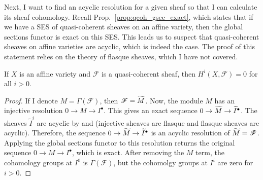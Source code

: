 Next, I want to find an acyclic resolution for a given sheaf so that I can
calculate its sheaf cohomology. Recall Prop.~\ref{prop:qcoh_gsec_exact},
which states that if we have a SES of quasi-coherent sheaves on an affine
variety, then the global sections functor is exact on this SES.
This leads us to suspect that quasi-coherent sheaves on affine varieties
are acyclic, which is indeed the case. The proof of this statement relies
on the theory of flasque sheaves, which I have not covered.
\begin{lemm}%
  \label{lemm:affine_cohom_vanishes}
  If $X$ is an affine variety and $\mathscr{F}$ is a quasi-coherent
  sheaf, then $H^{i}(X, \mathscr{F})=0$ for all $i>0$.
\end{lemm}
\begin{proof}
  If I denote $M=\Gamma(\mathscr{F})$, then $\mathscr{F}=\widetilde{M}$. Now, the
  module $M$ has an injective resolution $0\to M\to I^{\bullet}$.
  This gives an exact sequence $0\to \widetilde{M}\to\widetilde{I}^{\bullet}$.
  The sheaves $\widetilde{I}^{i}$ are acyclic by
  \cite[Prop. 3.4]{hartshorne} and \cite[Prop. 2.5]{hartshorne}
  (injective sheaves are flasque and flasque sheaves
  are acyclic). Therefore, the sequence $0\to \widetilde{M}\to\widetilde{I}^{\bullet}$
  is an acyclic resolution of $\widetilde{M}=\mathscr{F}$. Applying the global sections
  functor to this resolution returns the original sequence
  $0\to M\to I^{\bullet}$, which is exact. After removing the $M$ term, the
  cohomology groups at $I^{0}$ is $\Gamma(\mathscr{F})$, but the cohomolgy
  groups at $I^{i}$ are zero for $i>0$.
\end{proof}

